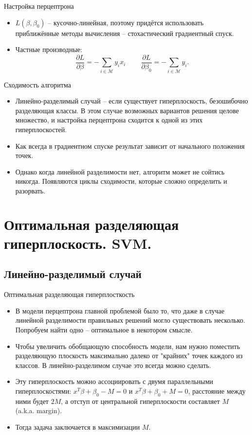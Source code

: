 \documentclass[9pt]{beamer}
\begin{document}
\begin{frame}{Настройка перцептрона}
\begin{itemize}
    \item $L(\beta, \beta_0)$ -- кусочно-линейная, поэтому придётся использовать приближённые методы вычисления -- стохастический градиентный спуск.
    \item Частные производные:
    $$\frac{\partial L}{\partial \beta} = -\sum_{i\in\mathcal{M}} y_ix_i \;\;\;\;\;\;\;\; \frac{\partial L}{\partial \beta_0} = -\sum_{i\in\mathcal{M}} y_i.$$
\end{itemize}
\end{frame}

\begin{frame}{Сходимость алгоритма}
\begin{itemize}
    \item Линейно-разделимый случай -- если существует гиперплоскость, безошибочно разделяющая классы. В этом случае возможных вариантов решения целове множество, и настройка перцептрона сходится к одной из этих гиперплоскостей.
    \item Как всегда в градиентном спуске результат зависит от начального положения точек.
    \item Однако когда линейной разделимости нет, алгоритм может не сойтись никогда. Появляются циклы сходимости, которые сложно определить и разорвать.
\end{itemize}
\end{frame}

\section{Оптимальная разделяющая гиперплоскость. SVM.}
\subsection{Линейно-разделимый случай}

\begin{frame}{Оптимальная разделяющая гиперплосткость}
\begin{itemize}
    \item В модели перцептрона главной проблемой было то, что даже в случае линейной разделимости правильных решений могло существовать несколько. Попробуем найти одно -- оптимальное в некотором смысле.
    \item Чтобы увеличить обобщающую способность модели, нам нужно поместить разделяющую плоскость максимально далеко от "крайних" точек каждого из классов. В линейно-разделимом случае это всегда можно сделать.
    \item Эту гиперплоскость можно ассоциировать с двумя параллельными гиперплоскостями: $x^T\beta+\beta_0-M=0$ и $x^T\beta+\beta_0 + M=0$, расстояние между ними будет $2M$, а отступ от центральной гиперплоскости составляет $M$ (a.k.a. margin).
    \item Тогда задача заключается в максимизации $M$.
\end{itemize}
\end{frame}
\end{document}
